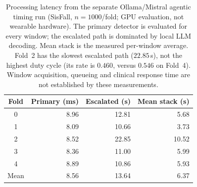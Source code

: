 \begin{table}[!t]
\centering
\caption{Processing latency from the separate Ollama/Mistral agentic timing run (SisFall, $n{=}1000$/fold; GPU evaluation, not wearable hardware). The primary detector is evaluated for every window; the escalated path is dominated by local LLM decoding. Mean stack is the measured per-window average. Fold~2 has the slowest escalated path ($22.85$\,s), not the highest duty cycle (its rate is $0.460$, versus $0.546$ on Fold~4). Window acquisition, queueing and clinical response time are not established by these measurements.}
\label{tab:latency}
\begin{tabular}{crrr}
\toprule
Fold & Primary (ms) & Escalated (s) & Mean stack (s) \\
\midrule
0 & 8.96 & 12.81 & 5.68 \\
1 & 8.09 & 10.66 & 3.73 \\
2 & 8.52 & 22.85 & 10.52 \\
3 & 8.36 & 11.00 & 5.99 \\
4 & 8.89 & 10.86 & 5.93 \\
\midrule
Mean & 8.56 & 13.64 & 6.37 \\
\bottomrule
\end{tabular}
\end{table}
